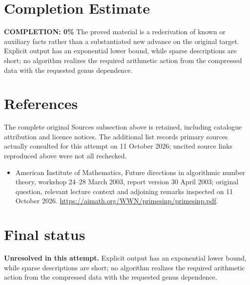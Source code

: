 \documentclass[11pt]{article}
\begin{document}
\section{Completion Estimate}
\noindent\textbf{COMPLETION: 0\%}
The proved material is a rederivation of known or auxiliary facts rather than a substantiated new advance on the original target. Explicit output has an exponential lower bound, while sparse descriptions are short; no algorithm realizes the required arithmetic action from the compressed data with the requested genus dependence.
\section{References}
The complete original Sources subsection above is retained, including catalogue attribution and licence notices. The additional list records primary sources actually consulted for this attempt on 11 October 2026; uncited source links reproduced above were not all rechecked.
\begin{itemize}
\item American Institute of Mathematics, Future directions in algorithmic number theory, workshop 24--28 March 2003, report version 30 April 2003; original question, relevant lecture context and adjoining remarks inspected on 11 October 2026. \url{https://aimath.org/WWN/primesinp/primesinp.pdf}.
\end{itemize}
\section{Final status}
\textbf{Unresolved in this attempt.} Explicit output has an exponential lower bound, while sparse descriptions are short; no algorithm realizes the required arithmetic action from the compressed data with the requested genus dependence.
\end{document}
